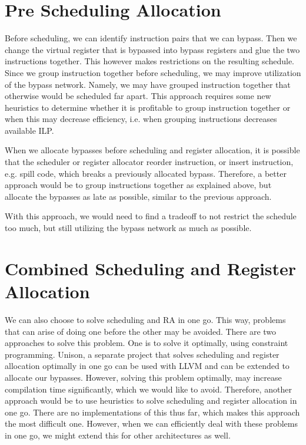 \section{Pre Scheduling Allocation}\label{sec:pre_scheduling}
Before scheduling, we can identify instruction pairs that we can bypass. Then we change the virtual register that is bypassed into bypass registers and glue the two instructions together. This however makes restrictions on the resulting schedule. Since we group instruction together before scheduling, we may improve utilization of the bypass network. Namely, we may have grouped instruction together that otherwise would be scheduled far apart. This approach requires some new heuristics to determine whether it is profitable to group instruction together or when this may decrease efficiency, i.e. when grouping instructions decreases available ILP. 

When we allocate bypasses before scheduling and register allocation, it is possible that the scheduler or register allocator reorder instruction, or insert instruction, e.g. spill code, which breaks a previously allocated bypass. Therefore, a better approach would be to group instructions together as explained above, but allocate the bypasses as late as possible, similar to the previous approach.

With this approach, we would need to find a tradeoff to not restrict the schedule too much, but still utilizing the bypass network as much as possible.   

\section{Combined Scheduling and Register Allocation}\label{sec:combined_sched_ra}
We can also choose to solve scheduling and RA in one go. This way, problems that can arise of doing one before the other may be avoided. There are two approaches to solve this problem. One is to solve it optimally, using constraint programming. Unison, a separate project that solves scheduling and register allocation optimally in one go can be used with LLVM and can be extended to allocate our bypasses. However, solving this problem optimally, may increase compilation time significantly, which we would like to avoid. Therefore, another approach would be to use heuristics to solve scheduling and register allocation in one go. There are no implementations of this thus far, which makes this approach the most difficult one. However, when we can efficiently deal with these problems in one go, we might extend this for other architectures as well. 